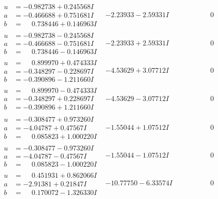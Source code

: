 \documentclass[1p]{elsarticle_modified}
\theoremstyle{definition}
\begin{document}
$$\begin{array}{c|c|c}
\begin{aligned}
u &= -0.982738 + 0.245568 I \\
a &= -0.466688 + 0.751681 I \\
b &= \phantom{-}0.738446 + 0.146963 I\end{aligned}
 & -2.23933 - 2.59331 I & \phantom{-0.000000 } 0 \\ \hline\begin{aligned}
u &= -0.982738 - 0.245568 I \\
a &= -0.466688 - 0.751681 I \\
b &= \phantom{-}0.738446 - 0.146963 I\end{aligned}
 & -2.23933 + 2.59331 I & \phantom{-0.000000 } 0 \\ \hline\begin{aligned}
u &= \phantom{-}0.899970 + 0.474333 I \\
a &= -0.348297 - 0.228697 I \\
b &= -0.390896 - 1.211660 I\end{aligned}
 & -4.53629 + 3.07712 I & \phantom{-0.000000 } 0 \\ \hline\begin{aligned}
u &= \phantom{-}0.899970 - 0.474333 I \\
a &= -0.348297 + 0.228697 I \\
b &= -0.390896 + 1.211660 I\end{aligned}
 & -4.53629 - 3.07712 I & \phantom{-0.000000 } 0 \\ \hline\begin{aligned}
u &= -0.308477 + 0.973260 I \\
a &= -4.04787 + 0.47567 I \\
b &= \phantom{-}0.085823 + 1.000220 I\end{aligned}
 & -1.55044 + 1.07512 I & \phantom{-0.000000 } 0 \\ \hline\begin{aligned}
u &= -0.308477 - 0.973260 I \\
a &= -4.04787 - 0.47567 I \\
b &= \phantom{-}0.085823 - 1.000220 I\end{aligned}
 & -1.55044 - 1.07512 I & \phantom{-0.000000 } 0 \\ \hline\begin{aligned}
u &= \phantom{-}0.451931 + 0.862066 I \\
a &= -2.91381 + 0.21847 I \\
b &= \phantom{-}0.170072 - 1.326330 I\end{aligned}
 & -10.77750 - 6.33574 I & \phantom{-0.000000 } 0 \\ \hline\begin{aligned}

\end{aligned}
\end{array}$$
\end{document}

